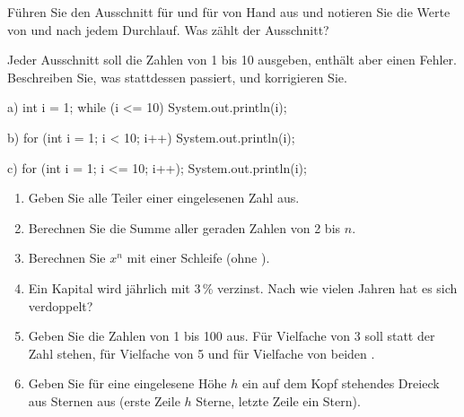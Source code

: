 Führen Sie den Ausschnitt für  und für  von Hand aus und notieren Sie die Werte von  und  nach jedem Durchlauf. Was zählt der Ausschnitt?

Jeder Ausschnitt soll die Zahlen von 1 bis 10 ausgeben, enthält aber einen Fehler. Beschreiben Sie, was stattdessen passiert, und korrigieren Sie.
\begin{tcbraster}[raster columns=3, raster equal height=rows, raster column skip=3mm]
\begin{javacode}[Ausschnitt]{a)}
int i = 1;
while (i <= 10) {
	System.out.println(i);
}
\end{javacode}
\begin{javacode}[Ausschnitt]{b)}
for (int i = 1; i < 10; i++) {
	System.out.println(i);
}
\end{javacode}
\begin{javacode}[Ausschnitt]{c)}
for (int i = 1; i <= 10; i++);
{
	System.out.println(i);
}
\end{javacode}
\end{tcbraster}

\begin{enumerate}[label=\alph*)]
\item Geben Sie alle Teiler einer eingelesenen Zahl aus.
\item Berechnen Sie die Summe aller geraden Zahlen von 2 bis $n$.
\item Berechnen Sie $x^n$ mit einer Schleife (ohne ).
\item Ein Kapital wird jährlich mit 3\,\% verzinst. Nach wie vielen Jahren hat es sich verdoppelt?
\item Geben Sie die Zahlen von 1 bis 100 aus. Für Vielfache von 3 soll statt der Zahl  stehen, für Vielfache von 5  und für Vielfache von beiden .
\item Geben Sie für eine eingelesene Höhe $h$ ein auf dem Kopf stehendes Dreieck aus Sternen aus (erste Zeile $h$ Sterne, letzte Zeile ein Stern).
\end{enumerate}
